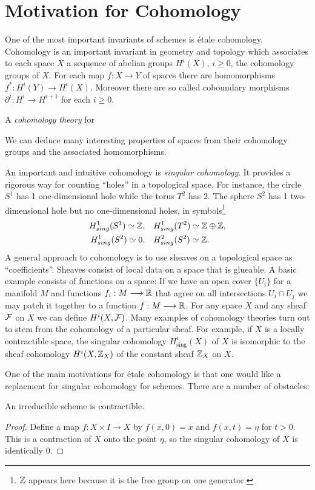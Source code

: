 \section{Motivation for Cohomology}
One of the most important invariants of schemes is \'etale cohomology.  Cohomology is an important invariant in geometry and topology which associates to each space $X$ a sequence of abelian groups $H^i(X)$, $i \ge 0$, the cohomology groups of $X$. For each map $f: X \to Y$ of spaces there are homomorphisms $f^*: H^i(Y) \to H^i(X)$. Moreover there are so called coboundary morphisms $\partial^i : H^i \to H^{i+1}$ for each $i \ge 0$.
\begin{definition}
	A \textit{cohomology theory} for
\end{definition}
We can deduce many interesting properties of spaces from their cohomology groups and the associated homomorphisms.

An important and intuitive cohomology is \textit{singular cohomology}. It provides a rigorous way for counting ``holes'' in a topological space. For instance, the circle $S^1$ has 1 one-dimensional hole while the torus $T^2$ has 2. The sphere $S^2$ has 1 two-dimensional hole but no one-dimensional holes, in symbols\footnote{$\mathbb{Z}$ appears here because it is the free group on one generator.}
\begin{align*}
	H^1_{sing}(S^1) \simeq \mathbb{Z},\quad & H^1_{sing}(T^2) \simeq \mathbb{Z} \oplus \mathbb{Z}, \\
	H^1_{sing}(S^2) \simeq  0,\quad & H^2_{sing}(S^2) \simeq \mathbb{Z}.
\end{align*}
A general approach to cohomology is to use sheaves on a topological space as ``coefficients''. Sheaves consist of local data on a space that is glueable. A basic example consists of functions on a space: If we have an open cover $\{ U_i\}$ for a manifold $M$ and functions $f_i: M \longrightarrow \mathbb{R}$ that agree on all intersections $U_i \cap U_j$ we may patch it together to a function $f: M \longrightarrow \mathbb{R}$.
For any space $X$ and any sheaf $\mathcal{F}$ on $X$ we can define $H^i(X, \mathcal{F})$. Many examples of cohomology theories turn out to stem from the cohomology of a particular sheaf. For example, if $X$ is a locally contractible space, the singular cohomology $H_{\text{sing}}^i(X)$ of $X$ is isomorphic to the sheaf cohomology $H^i(X, \mathbb{Z}_X)$ of the constant sheaf $\mathbb{Z}_X$ on $X$.

One of the main motivations for \'etale cohomology is that one would like a replacment for singular cohomology for schemes. There are a number of obstacles:
\begin{proposition}\label{scheme_contractible}
	An irreducible scheme is contractible.
\end{proposition}
\begin{proof}
	Define a map $f: X \times I \to X$  by $f(x,0) = x$ and $f(x,t) = \eta$ for $t > 0$. This is a contraction of $X$ onto the point $\eta$, so the singular cohomology of $X$ is identically 0.
\end{proof}

